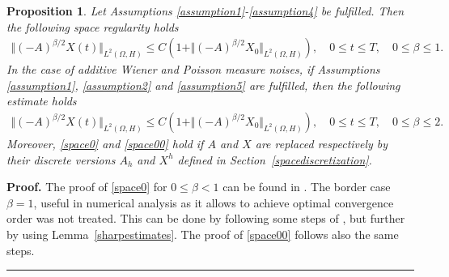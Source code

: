 \documentclass[review,12pt]{elsarticle}
\newtheorem{proposition}{Proposition}[section]
\newenvironment{proof}[1][Proof]{\textbf{#1.} }{\hspace{\stretch{1}}\rule{0.5em}{0.5em}}
\newcommand{\lemref}[1]{{Lemma~\ref{#1}}}
\newcommand{\secref}[1]{{Section~\ref{#1}}}
\begin{document}
 \begin{proposition}
 \label{spaceregular}
 Let Assumptions \ref{assumption1}-\ref{assumption4} be fulfilled. Then the following space regularity holds
 \begin{eqnarray}
 \label{space0}
 \Vert (-A)^{\beta/2}X(t)\Vert_{L^2(\Omega, H)}\leq C\left(1+\Vert (-A)^{\beta/2}X_0\Vert_{L^2(\Omega, H)} \right),\quad 0\leq t\leq T,\quad 0\leq \beta\leq 1.
 \end{eqnarray}
 In the case of additive Wiener  and Poisson measure noises, if Assumptions \ref{assumption1}, \ref{assumption2} and \ref{assumption5}  are fulfilled, then the following estimate holds
 \begin{eqnarray}
 \label{space00}
 \Vert (-A)^{\beta/2}X(t)\Vert_{L^2(\Omega, H)}\leq C\left(1+\Vert (-A)^{\beta/2}X_0\Vert_{L^2(\Omega, H)} \right),\quad 0\leq t\leq T,\quad 0\leq \beta\leq 2.
 \end{eqnarray}
 Moreover, \eqref{space0} and \eqref{space00} hold if $A$ and $X$ are replaced respectively  by their discrete versions $A_h$ and $X^h$ defined in \secref{spacediscretization}.
 \end{proposition}
 \begin{proof}
 The proof of \eqref{space0} for $0\leq\beta<1$ can be found in \cite[Theorem 3.1]{Yang}. The border case $\beta=1$, useful in numerical analysis as it allows to achieve optimal convergence order was not treated. This can be done by following some steps of \cite[Theorem 3.1]{Yang}, but  further by using \lemref{sharpestimates}. The proof of \eqref{space00} follows also the same steps. 
\end{proof}
\end{document}
